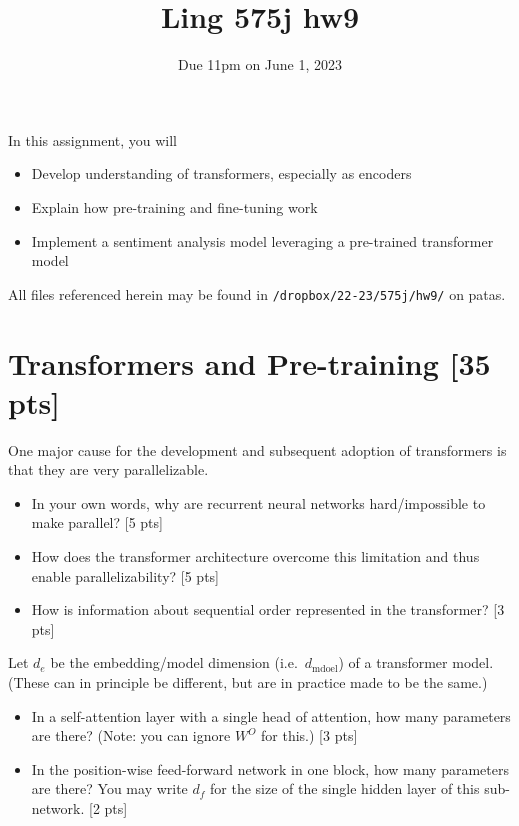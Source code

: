 \documentclass[11pt]{article}
\begin{document}
\title{Ling 575j hw9}
\date{\vspace{-0.2in}Due 11pm on June 1, 2023}
\maketitle


\noindent In this assignment, you will 
\begin{itemize}
  \item Develop understanding of transformers, especially as encoders
  \item Explain how pre-training and fine-tuning work
  \item Implement a sentiment analysis model leveraging a pre-trained transformer model
\end{itemize}
All files referenced herein may be found in \texttt{/dropbox/22-23/575j/hw9/} on patas.


\section{Transformers and Pre-training [35 pts]}

 One major cause for the development and subsequent adoption of transformers is that they are very parallelizable.
\begin{itemize}
  \item In your own words, why are recurrent neural networks hard/impossible to make parallel? \hfill [5 pts]
  \item How does the transformer architecture overcome this limitation and thus enable parallelizability? \hfill [5 pts]
  \item How is information about sequential order represented in the transformer? \hfill [3 pts]
\end{itemize}

\vspace{2em}
 Let $d_e$ be the embedding/model dimension (i.e.\ $d_\text{mdoel}$) of a transformer model.  (These can in principle be different, but are in practice made to be the same.)
\begin{itemize}
  \item In a self-attention layer with a single head of attention, how many parameters are there? (Note: you can ignore $W^O$ for this.) \hfill [3 pts]
  \item In the position-wise feed-forward network in one block, how many parameters are there? You may write $d_f$ for the size of the single hidden layer of this sub-network. \hfill [2 pts]
\end{itemize}
\end{document}
